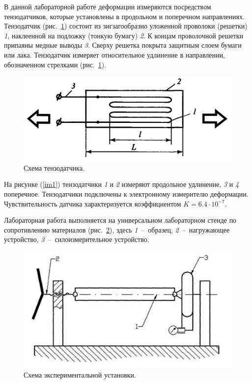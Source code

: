 \documentclass[12pt, a4paper]{article}
\begin{document}
    В данной лабораторной работе деформации измеряются посредством тензодатчиков, которые установлены в продольном и поперечном направлениях. Тензодатчик (рис.~\ref{im2}) состоит из зигзагообразно уложенной проволоки (решетки) \textit{1}, наклеенной на подложку (тонкую бумагу) \textit{2}. К концам проволочной решетки припаяны медные выводы \textit{3}. Сверху решетка покрыта защитным слоем бумаги или лака. Тензодатчик измеряет относительное удлинение в направлении, обозначенном стрелками (рис.~\ref{im2}).
    
    \begin{figure}[h]
        \centering
        \includegraphics[width = 12cm]{image_2.png}
        \caption{Схема тензодатчика.}
        \label{im2}
    \end{figure}
    
    На рисунке (\ref{im1}) тензодатчики \textit{1} и \textit{2} измеряют продольное удлинение, \textit{3} и \textit{4} поперечное. Тензодатчики подключены к электронному измерителю деформации. Чувствительность датчика характеризуется коэффициентом $K = 6.4 \cdot 10^{-7}$.
    
    Лабораторная работа выполняется на универсальном лабораторном 
    стенде по сопротивлению материалов (рис.~\ref{im3}), здесь \textit{1}~--~образец, \textit{2}~--~нагружающее устройство, \textit{3}~--~силоизмерительное устройство.
    
    \begin{figure}[h]
        \centering
        \includegraphics[width = 12cm]{image_3.jpg}
        \caption{Схема экспериментальной установки.}
        \label{im3}
    \end{figure}
    
\end{document}
